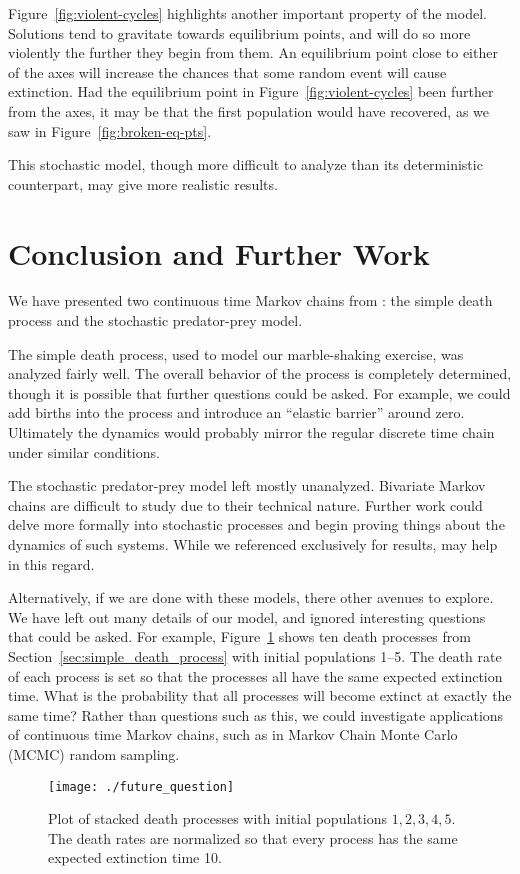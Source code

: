 \documentclass[12pt]{article}
\theoremstyle{definition}
\begin{document}
Figure~\ref{fig:violent-cycles} highlights another important property of the
model. Solutions tend to gravitate towards equilibrium points, and will do so
more violently the further they begin from them. An equilibrium point close to
either of the axes will increase the chances that some random event will cause
extinction. Had the equilibrium point in Figure~\ref{fig:violent-cycles} been
further from the axes, it may be that the first population would have
recovered, as we saw in Figure~\ref{fig:broken-eq-pts}.

This stochastic model, though more difficult to analyze than its deterministic
counterpart, may give more realistic results.

\section{Conclusion and Further Work}
\label{sec:further_work}

We have presented two continuous time Markov chains from
\cite{allen2010introduction}: the simple death process and the stochastic
predator-prey model.

The simple death process, used to model our marble-shaking exercise, was
analyzed fairly well. The overall behavior of the process is completely
determined, though it is possible that further questions could be asked. For
example, we could add births into the process and introduce an ``elastic
barrier'' around zero. Ultimately the dynamics would probably mirror the
regular discrete time chain under similar conditions.

The stochastic predator-prey model left mostly unanalyzed. Bivariate Markov
chains are difficult to study due to their technical nature. Further work could
delve more formally into stochastic processes and begin proving things about
the dynamics of such systems. While we referenced \citet{allen2010introduction}
exclusively for results, \cite{kao1997introduction, berger2012introduction,
bremaud1998markov} may help in this regard.

Alternatively, if we are done with these models, there other avenues to
explore. We have left out many details of our model, and ignored interesting
questions that could be asked. For example, Figure~\ref{fig:stacked-death}
shows ten death processes from Section~\ref{sec:simple_death_process} with
initial populations 1--5. The death rate of each process is set so that the
processes all have the same expected extinction time. What is the probability
that all processes will become extinct at exactly the same time? Rather than
questions such as this, we could investigate applications of continuous time
Markov chains, such as in Markov Chain Monte Carlo (MCMC) random sampling.

\begin{figure}[b]
    \centering
    \texttt{[image: ./future\_question]}
    \caption{Plot of stacked death processes with initial populations $1, 2, 3,
    4, 5$. The death rates are normalized so that every process has the same
    expected extinction time 10.}
    \label{fig:stacked-death}
\end{figure}

\pagebreak


\end{document}
